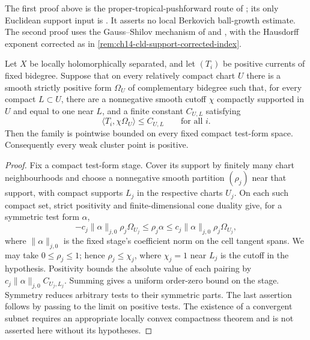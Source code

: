 


\begin{remark}
\label{rem:ch14-support-route}
The first proof above is the proper-tropical-pushforward route of
\cite[Theorem~16.8.5]{CLD25}; its only Euclidean support input is
\cite[Corollary~4.1]{Lag12Super}.  It asserts no local Berkovich ball-growth
estimate.  The second proof uses the Gauss--Shilov mechanism of
\cite[Proposition~16.8.2 and Proposition~8.7.5]{CLD25} and
\cite[Lemma~16.8.7 and the proof of Corollary~16.8.6]{CLD25}, with the
Hausdorff exponent corrected as in
\cref{rem:ch14-cld-support-corrected-index}.
\end{remark}

\begin{proposition}
\label{prop:positive-current-compactness}
Let $X$ be locally holomorphically separated, and let $(T_i)$ be positive
currents of fixed bidegree. Suppose that on every relatively compact chart
$U$ there is a smooth strictly positive form $\Omega_U$ of complementary
bidegree such that, for every compact $L\subset U$, there are a nonnegative
smooth cutoff $\chi$ compactly supported in $U$ and equal to one near $L$,
and a finite constant $C_{U,L}$ satisfying
\[
                 \langle T_i,\chi\Omega_U\rangle\leq C_{U,L}
                 \qquad\text{for all }i.
\]
Then the family is pointwise bounded on every fixed compact test-form space.
Consequently every weak cluster point is positive.
\end{proposition}
\begin{proof}
Fix a compact test-form stage. Cover its support by finitely many chart
neighbourhoods and choose a nonnegative smooth partition $(\rho_j)$ near
that support, with compact supports $L_j$ in the respective charts $U_j$.
On each such compact set, strict positivity and finite-dimensional cone
duality give, for a symmetric test form $\alpha$,
\[
 -c_j\|\alpha\|_{j,0}\rho_j\Omega_{U_j}\leq\rho_j\alpha\leq
 c_j\|\alpha\|_{j,0}\rho_j\Omega_{U_j},
\]
where $\|\alpha\|_{j,0}$ is the fixed stage's coefficient norm on the cell
tangent spans. We may take $0\le\rho_j\le1$; hence
$\rho_j\le\chi_j$, where $\chi_j=1$ near $L_j$ is the cutoff in the
hypothesis. Positivity bounds the absolute value of each pairing by
$c_j\|\alpha\|_{j,0}C_{U_j,L_j}$. Summing gives a uniform order-zero
bound on the stage. Symmetry reduces arbitrary tests to their symmetric
parts.
The last assertion follows by passing to the limit on positive tests.  The
existence of a convergent subnet requires an appropriate locally convex
compactness theorem and is not asserted here without its hypotheses.
\end{proof}

